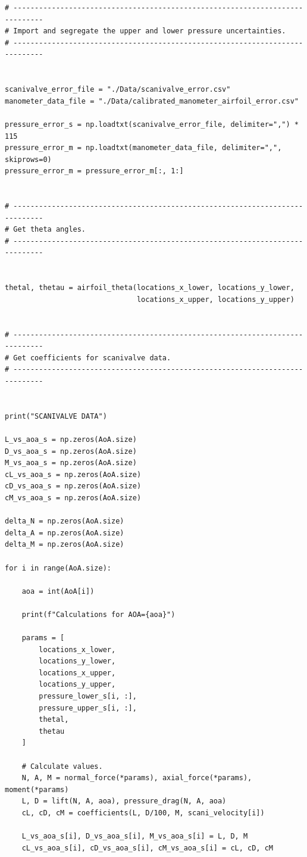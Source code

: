 \documentclass[runningheads]{llncs}
\begin{document}
\begin{verbatim}
# -----------------------------------------------------------------------------
# Import and segregate the upper and lower pressure uncertainties.
# -----------------------------------------------------------------------------


scanivalve_error_file = "./Data/scanivalve_error.csv"
manometer_data_file = "./Data/calibrated_manometer_airfoil_error.csv"

pressure_error_s = np.loadtxt(scanivalve_error_file, delimiter=",") * 115
pressure_error_m = np.loadtxt(manometer_data_file, delimiter=",", skiprows=0)
pressure_error_m = pressure_error_m[:, 1:]


# -----------------------------------------------------------------------------
# Get theta angles.
# -----------------------------------------------------------------------------


thetal, thetau = airfoil_theta(locations_x_lower, locations_y_lower,
                               locations_x_upper, locations_y_upper)


# -----------------------------------------------------------------------------
# Get coefficients for scanivalve data.
# -----------------------------------------------------------------------------


print("SCANIVALVE DATA")

L_vs_aoa_s = np.zeros(AoA.size)
D_vs_aoa_s = np.zeros(AoA.size)
M_vs_aoa_s = np.zeros(AoA.size)
cL_vs_aoa_s = np.zeros(AoA.size)
cD_vs_aoa_s = np.zeros(AoA.size)
cM_vs_aoa_s = np.zeros(AoA.size)

delta_N = np.zeros(AoA.size)
delta_A = np.zeros(AoA.size)
delta_M = np.zeros(AoA.size)

for i in range(AoA.size):

    aoa = int(AoA[i])

    print(f"Calculations for AOA={aoa}")

    params = [
        locations_x_lower,
        locations_y_lower,
        locations_x_upper,
        locations_y_upper,
        pressure_lower_s[i, :],
        pressure_upper_s[i, :],
        thetal,
        thetau
    ]

    # Calculate values.
    N, A, M = normal_force(*params), axial_force(*params), moment(*params)
    L, D = lift(N, A, aoa), pressure_drag(N, A, aoa)
    cL, cD, cM = coefficients(L, D/100, M, scani_velocity[i])

    L_vs_aoa_s[i], D_vs_aoa_s[i], M_vs_aoa_s[i] = L, D, M
    cL_vs_aoa_s[i], cD_vs_aoa_s[i], cM_vs_aoa_s[i] = cL, cD, cM


\end{verbatim}
\end{document}
